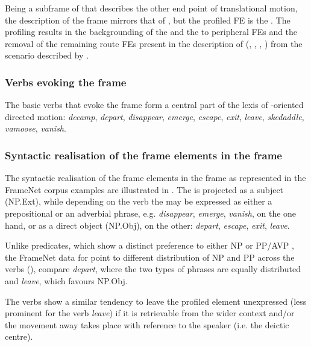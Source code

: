 \documentclass[output=paper,colorlinks,citecolor=brown]{langscibook}
\begin{document}
Being a subframe of  that describes the other end point of translational motion, the description of the  frame mirrors that of , but the profiled FE is the . The profiling results in the backgrounding of the  and the  to peripheral FEs and the removal of the remaining route FEs present in the description of  (, , , ) from the scenario described by .

\subsubsection{Verbs evoking the  frame}

The basic verbs that evoke the  frame form a central part of the lexis of -oriented directed motion: \textit{decamp}, \textit{depart}, \textit{disappear}, \textit{emerge}, \textit{escape}, \textit{exit}, \textit{leave}, \textit{skedaddle}, \textit{vamoose}, \textit{vanish}.

\subsubsection{Syntactic realisation of the frame elements in the  frame}

The syntactic realisation of the frame elements in the  frame as represented in the FrameNet corpus examples are illustrated in . The  is projected as a subject (NP.Ext), while depending on the verb the  may be expressed as either a prepositional or an adverbial phrase, e.g. \textit{disappear}, \textit{emerge}, \textit{vanish}, on the one hand, or as a direct object (NP.Obj), on the other: \textit{depart}, \textit{escape}, \textit{exit}, \textit{leave}.

Unlike  predicates, which show a distinct preference to either NP or PP/AVP , the FrameNet data for  point to different distribution of NP and PP  across the verbs (), compare \textit{depart}, where the two types of phrases are equally distributed and \textit{leave}, which favours NP.Obj.

The  verbs show a similar tendency to leave the profiled element unexpressed (less prominent for the verb \textit{leave}) if it is retrievable from the wider context and/or the movement away takes place with reference to the speaker (i.e. the deictic centre). 
\end{document}
